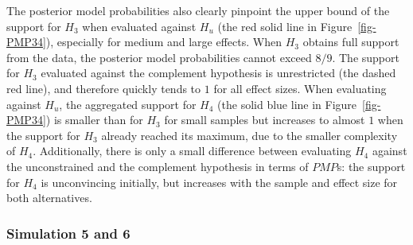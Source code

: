 \documentclass[
]{interact}
\begin{document}
                    The posterior model probabilities also clearly pinpoint the upper bound
                    of the support for \(H_3\) when evaluated against \(H_u\) (the red solid
                                                                               line in Figure~\ref{fig-PMP34}), especially for medium and large
                    effects. When \(H_3\) obtains full support from the data, the posterior
                    model probabilities cannot exceed \(8/9\). The support for \(H_3\)
                    evaluated against the complement hypothesis is unrestricted (the dashed
                                                                                 red line), and therefore quickly tends to \(1\) for all effect sizes.
                    When evaluating against \(H_u\), the aggregated support for \(H_4\) (the
                                                                                         solid blue line in Figure~\ref{fig-PMP34}) is smaller than for \(H_3\)
                    for small samples but increases to almost \(1\) when the support for
                    \(H_3\) already reached its maximum, due to the smaller complexity of
                    \(H_4\). Additionally, there is only a small difference between
                    evaluating \(H_4\) against the unconstrained and the complement
                    hypothesis in terms of \(PMP\)s: the support for \(H_4\) is unconvincing
                    initially, but increases with the sample and effect size for both
                    alternatives.
                    
                    \hypertarget{simulation-5-and-6}{%
                      \subsubsection{Simulation 5 and 6}\label{simulation-5-and-6}}
                    
\end{document}
